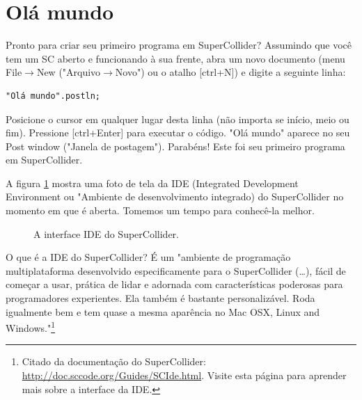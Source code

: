 
\section{Olá mundo}

Pronto para criar seu primeiro programa em SuperCollider? Assumindo que você tem um SC aberto e funcionando à sua frente, abra um novo documento (menu File$\rightarrow$New ("Arquivo$\rightarrow$Novo") ou o atalho [ctrl+N]) e digite a seguinte linha:

 
\begin{lstlisting}[style=SuperCollider-IDE, basicstyle=\scttfamily\footnotesize ]
"Olá mundo".postln;
\end{lstlisting}
 
Posicione o cursor em qualquer lugar desta linha (não importa se início, meio ou fim). Pressione [ctrl+Enter] para executar o código. "Olá mundo" aparece no seu Post window ("Janela de postagem"). Parabéns! Este foi seu primeiro programa em SuperCollider.

 
\bigskip
{}
\bigskip
 

A figura \ref{fig:scidegui} mostra uma foto de tela da IDE (Integrated Development Environment ou "Ambiente de desenvolvimento integrado) do SuperCollider no momento em que é aberta. Tomemos um tempo para conhecê-la melhor.

\begin{figure}[t]
\centerline{}
\caption{A interface IDE do SuperCollider.}
\label{fig:scidegui}
\end{figure}

O que é a IDE do SuperCollider? É um "ambiente de programação multiplataforma desenvolvido especificamente para o SuperCollider (\dots), 
fácil de começar a usar, prática de lidar e adornada com características poderosas para programadores experientes. Ela também é bastante personalizável. Roda igualmente bem e tem quase a mesma aparência no 
Mac OSX, Linux and Windows."\footnote{Citado da documentação do SuperCollider: \url{http://doc.sccode.org/Guides/SCIde.html}. Visite esta página para aprender mais sobre a interface da IDE.}

